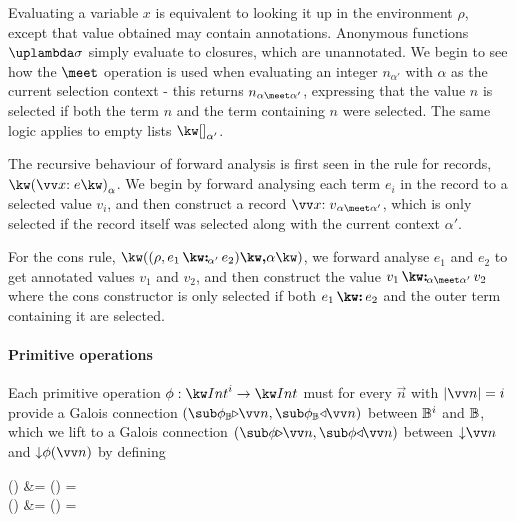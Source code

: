 Evaluating a variable $x$ is equivalent to looking it up in the environment $\rho$, except that value obtained may contain annotations. Anonymous functions $\exLambda{\sigma}$ simply evaluate to closures, which are unannotated. We begin to see how the $\meet$ operation is used when evaluating an integer $n_{\alpha'}$ with $\alpha$ as the current selection context - this returns $\annot{n}{\alpha \meet \alpha'}$, expressing that the value $n$ is selected if both the term $n$ and the term containing $n$ were selected. The same logic applies to empty lists $\annot{\exNil}{\alpha'}$.

The recursive behaviour of forward analysis is first seen in the rule for records, $\exRec{\vec{\bind{x}{e}}}_{\alpha}$. We begin by forward analysing each term $e_i$ in the record to a selected value $v_i$, and then construct a record $\annot{\vec{\bind{x}{v}}}{\alpha \meet \alpha'}$, which is only selected if the record itself was selected along with the current context $\alpha'$.

For the cons rule, $\exPair{(\rho,\annCons{e_1}{e_2}{\alpha'})}{\alpha}$, we forward analyse $e_1$ and $e_2$ to get annotated values $v_1$ and $v_2$, and then construct the value $\annCons{v_1}{v_2}{\alpha \meet \alpha'}$ where the cons constructor is only selected if both $\exCons{e_1}{e_2}$ and the outer term containing it are selected.


\paragraph{Primitive operations}

Each primitive operation $\phi: \tyInt^{i} \to \tyInt$ must for every $\vec{n}$ with $\length{\vec{n}} = i$ provide a Galois connection $(\primFwdBool{\phi}{\vec{n}}, \primBwdBool{\phi}{\vec{n}})$ between $\mathbb{B}^i$ and $\mathbb{B}$, which we lift to a Galois connection $(\primFwd{\phi}{\vec{n}}, \primBwd{\phi}{\vec{n}})$ between $\Below{\vec{n}}$ and $\Below{\phi(\vec{n})}$ by defining
\begin{definition}
\label{def:core-language:primop-gc}
\begin{salign}
   () &= 
   (\vec{\alpha}) = \beta
   \\
   () &= 
   (\beta) = \vec{\alpha}
\end{salign}
\end{definition}


